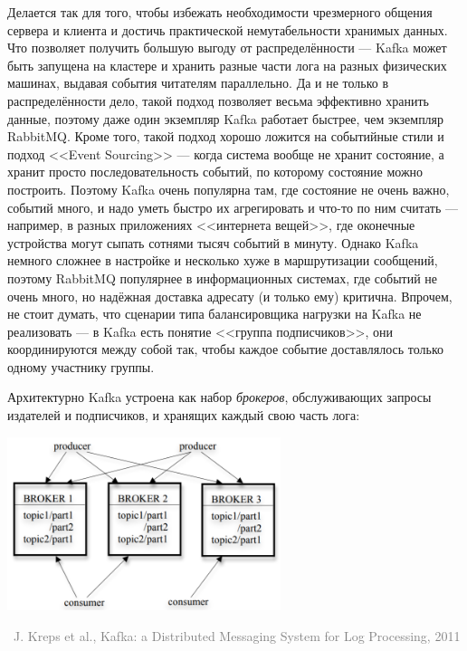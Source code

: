 \documentclass[a5paper]{article}
\newcommand{\attribution}[1] {
    \vspace{-5mm}\begin{flushright}\begin{scriptsize}\textcolor{gray}{\textcopyright\, #1}\end{scriptsize}\end{flushright}
}
\begin{document}
Делается так для того, чтобы избежать необходимости чрезмерного общения сервера и клиента и достичь практической немутабельности хранимых данных. Что позволяет получить большую выгоду от распределённости --- Kafka может быть запущена на кластере и хранить разные части лога на разных физических машинах, выдавая события читателям параллельно. Да и не только в распределённости дело, такой подход позволяет весьма эффективно хранить данные, поэтому даже один экземпляр Kafka работает быстрее, чем экземпляр RabbitMQ. Кроме того, такой подход хорошо ложится на событийные стили и подход <<Event Sourcing>> --- когда система вообще не хранит состояние, а хранит просто последовательность событий, по которому состояние можно построить. Поэтому Kafka очень популярна там, где состояние не очень важно, событий много, и надо уметь быстро их агрегировать и что-то по ним считать --- например, в разных приложениях <<интернета вещей>>, где оконечные устройства могут сыпать сотнями тысяч событий в минуту. Однако Kafka немного сложнее в настройке и несколько хуже в маршрутизации сообщений, поэтому RabbitMQ популярнее в информационных системах, где событий не очень много, но надёжная доставка адресату (и только ему) критична. Впрочем, не стоит думать, что сценарии типа балансировщика нагрузки на Kafka не реализовать --- в Kafka есть понятие <<группа подписчиков>>, они координируются между собой так, чтобы каждое событие доставлялось только одному участнику группы.

Архитектурно Kafka устроена как набор \emph{брокеров}, обслуживающих запросы издателей и подписчиков, и хранящих каждый свою часть лога:

\begin{center}
    \includegraphics[width=0.6\textwidth]{kafkaArchitecture.png}
    \attribution{J. Kreps et al., Kafka: a Distributed Messaging System for Log Processing, 2011}
\end{center}
\end{document}
